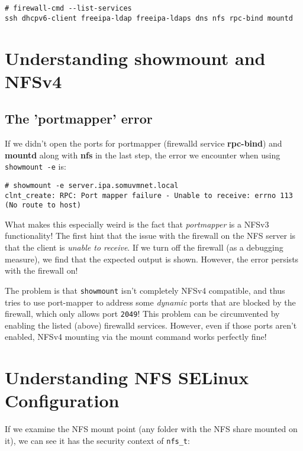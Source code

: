 \vspace{-15pt}
\begin{verbatim}
# firewall-cmd --list-services 
ssh dhcpv6-client freeipa-ldap freeipa-ldaps dns nfs rpc-bind mountd
\end{verbatim}
\vspace{-10pt}	

\section{Understanding showmount and NFSv4}
\vspace{-10pt}
\subsection{The 'portmapper' error}
If we didn't open the ports for portmapper (firewalld service \textbf{rpc-bind}) and \textbf{mountd} along with \textbf{nfs} in the last step, the error we encounter when using \verb|showmount -e| is:

\vspace{-15pt}
\begin{verbatim}
# showmount -e server.ipa.somuvmnet.local
clnt_create: RPC: Port mapper failure - Unable to receive: errno 113 (No route to host)
\end{verbatim}
\vspace{-10pt}	

\noindent
What makes this especially weird is the fact that \textit{portmapper} is a NFSv3 functionality! The first hint that the issue with the firewall on the NFS server is that the client is \textit{unable to receive}. If we turn off the firewall (as a debugging measure), we find that the expected output is shown. However, the error persists with the firewall on!

The problem is that \verb|showmount| isn't completely NFSv4 compatible, and thus tries to use port-mapper to address some \textit{dynamic} ports that are blocked by the firewall, which only allows port \verb|2049|! This problem can be circumvented by enabling the listed (above) firewalld services. However, even if those ports aren't enabled, NFSv4 mounting via the mount command works perfectly fine!

\section{Understanding NFS SELinux Configuration}
If we examine the NFS mount point (any folder with the NFS share mounted on it), we can see it has the security context of \verb|nfs_t|:

